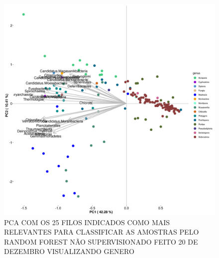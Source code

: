 \documentclass[12pt, a4paper]{report}
\begin{document}
\begin{figure}[H]
	\centering
	\includegraphics[scale=0.4]{figures/PCA_rf_nao_super_25_157_corais_genus_2018_12_20.png}
	\caption{PCA COM OS 25 FILOS INDICADOS COMO MAIS RELEVANTES PARA CLASSIFICAR AS AMOSTRAS PELO RANDOM FOREST NÃO SUPERVISIONADO FEITO 20 DE DEZEMBRO VISUALIZANDO GENERO}
	\label{fig: PCA COM OS 25 FILOS INDICADOS COMO MAIS RELEVANTES PARA CLASSIFICAR AS AMOSTRAS PELO RANDOM FOREST NÃO SUPERVISIONADO FEITO 20 DE DEZEMBRO VISUALIZANDO GENERO DE CORAIS}
\end{figure}
\end{document}
